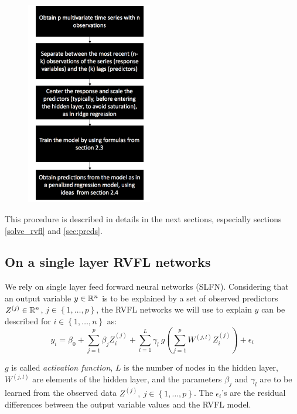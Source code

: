 \begin{figure}[!htb]
\centering
\includegraphics[width=5.5cm]{gfx/chapter-rvfl-mts/flowchart}
\caption{}
\label{fig:flowchart}
\end{figure}


This procedure is described in details in the next sections, especially sections \ref{solve_rvfl} and \ref{sec:preds}. 

\clearpage

\subsection{On a single layer RVFL networks}
\label{sec:modeldesc}

We rely on single layer feed forward neural networks (SLFN).
Considering that an output variable $y \in \mathbb{R}^n$ is to be explained by a set of observed predictors $Z^{(j)} \in \mathbb{R}^n$, $j \in \left\lbrace 1, \ldots,
p\right\rbrace$, the RVFL networks we will use to explain $y$ can be described for $i \in \left\lbrace 1, \ldots, n\right\rbrace$ as:
$$
y_i = \beta_0 + \sum_{j = 1}^p \beta_j Z_i^{(j)} + \sum_{l = 1}^L \gamma_l \:
g\left(\sum_{j = 1}^p W^{(j, l)} Z_i^{(j)}\right) + \epsilon_i
$$

\medskip

$g$ is called \textit{activation function}, $L$ is the number of nodes in the hidden
layer, $W^{(j, l)}$ are elements of the hidden layer, and the parameters
$\beta_j$ and $\gamma_l$ are to be learned from the observed data $Z^{(j)}, \: j
\in \left\lbrace 1, \ldots, p\right\rbrace$. The $\epsilon_i$'s are the residual
differences between the output variable values and the RVFL model.

\medskip

